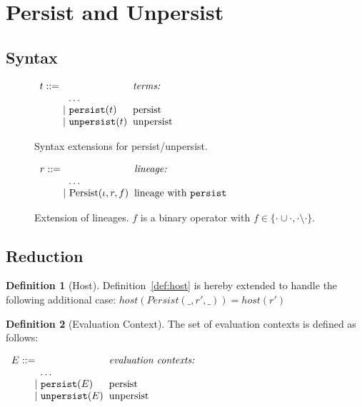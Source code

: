 \documentclass{article}
\theoremstyle{definition}
\newtheorem{defn}{Definition}[section]
\newcommand{\gap}{\quad\quad}
\newcommand{\ba}{\begin{array}}
\newcommand{\ea}{\end{array}}
\begin{document}
\section{Persist and Unpersist}

\subsection{Syntax}

\begin{figure}
  \centering
$\ba[t]{l@{\hspace{2mm}}l}
t ::=                                     & \mbox{{\it terms:}}         \\
\gap \:\:\:\: \ldots                      & \mbox{} \\
\gap ~|~ \texttt{persist}(t)              & \mbox{persist}     \\
\gap ~|~ \texttt{unpersist}(t)            & \mbox{unpersist}     \\
\ea$
  \caption{Syntax extensions for persist/unpersist.}
  \label{fig:persist-syntax}
\end{figure}

\begin{figure}[ht!]
\centering

$\ba[t]{l@{\hspace{2mm}}l}
r ::=                                    & \mbox{{\it{lineage:}}} \\
\gap \:\:\:\: \ldots                     & \mbox{} \\
\gap ~|~  \text{Persist}(\iota, r, f)    & \mbox{lineage with \texttt{persist}} \\    
\ea$

\caption{Extension of lineages. $f$ is a binary operator with $f \in \{\cdot\cup\cdot, \cdot\setminus\cdot\}.$}
\end{figure}

\subsection{Reduction}

\begin{defn}[Host]
  Definition~\ref{def:host} is hereby extended to handle the following additional case: $host(Persist(\_, r', \_)) = host(r')$
\end{defn}

\begin{defn}[Evaluation Context]
  The set of evaluation contexts is defined as follows:
  
$\ba[t]{l@{\hspace{2mm}}l}
E ::=                             & \mbox{\it{evaluation contexts:}} \\
\gap \:\:\:\: \ldots              & \mbox{} \\
\gap ~|~  \texttt{persist}(E)     & \mbox{persist} \\
\gap ~|~  \texttt{unpersist}(E)   & \mbox{unpersist} \\
\ea$ 
\end{defn}
\end{document}
